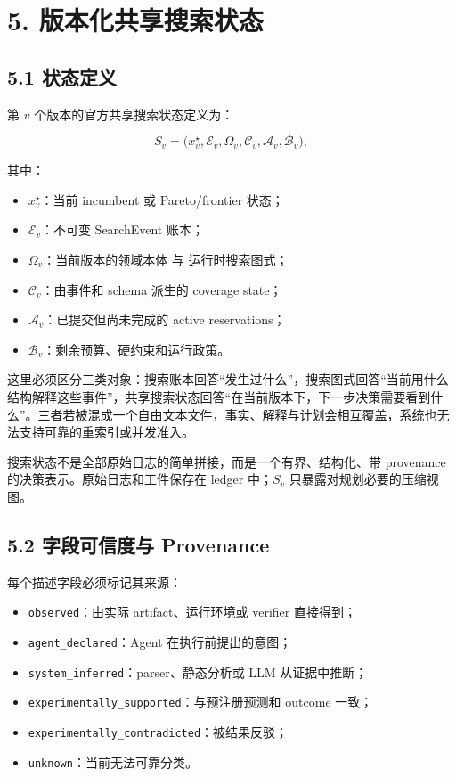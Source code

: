 \documentclass[
  11pt]{ctexart}
\providecommand{\tightlist}{%
  \setlength{\itemsep}{0pt}\setlength{\parskip}{0pt}}
\begin{document}
\section{5.
版本化共享搜索状态}\label{ux7248ux672cux5316ux5171ux4eabux641cux7d22ux72b6ux6001}

\subsection{5.1 状态定义}\label{ux72b6ux6001ux5b9aux4e49}

第 \(v\) 个版本的官方共享搜索状态定义为：

\[
S_v=
\bigl(
 x_v^\star,
 \mathcal{E}_v,
 \Omega_v,
 \mathcal{C}_v,
 \mathcal{A}_v,
 \mathcal{B}_v
\bigr),
\]

其中：

\begin{itemize}
\tightlist
\item
  \(x_v^\star\)：当前 incumbent 或 Pareto/frontier 状态；
\item
  \(\mathcal{E}_v\)：不可变 SearchEvent 账本；
\item
  \(\Omega_v\)：当前版本的领域本体 与 运行时搜索图式；
\item
  \(\mathcal{C}_v\)：由事件和 schema 派生的 coverage state；
\item
  \(\mathcal{A}_v\)：已提交但尚未完成的 active reservations；
\item
  \(\mathcal{B}_v\)：剩余预算、硬约束和运行政策。
\end{itemize}

这里必须区分三类对象：搜索账本回答``发生过什么''，搜索图式回答``当前用什么结构解释这些事件''，共享搜索状态回答``在当前版本下，下一步决策需要看到什么''。三者若被混成一个自由文本文件，事实、解释与计划会相互覆盖，系统也无法支持可靠的重索引或并发准入。

搜索状态不是全部原始日志的简单拼接，而是一个有界、结构化、带 provenance
的决策表示。原始日志和工件保存在 ledger 中；\(S_v\)
只暴露对规划必要的压缩视图。

\subsection{5.2 字段可信度与
Provenance}\label{ux5b57ux6bb5ux53efux4fe1ux5ea6ux4e0e-provenance}

每个描述字段必须标记其来源：

\begin{itemize}
\tightlist
\item
  \texttt{observed}：由实际 artifact、运行环境或 verifier 直接得到；
\item
  \texttt{agent\_declared}：Agent 在执行前提出的意图；
\item
  \texttt{system\_inferred}：parser、静态分析或 LLM 从证据中推断；
\item
  \texttt{experimentally\_supported}：与预注册预测和 outcome 一致；
\item
  \texttt{experimentally\_contradicted}：被结果反驳；
\item
  \texttt{unknown}：当前无法可靠分类。
\end{itemize}
\end{document}
